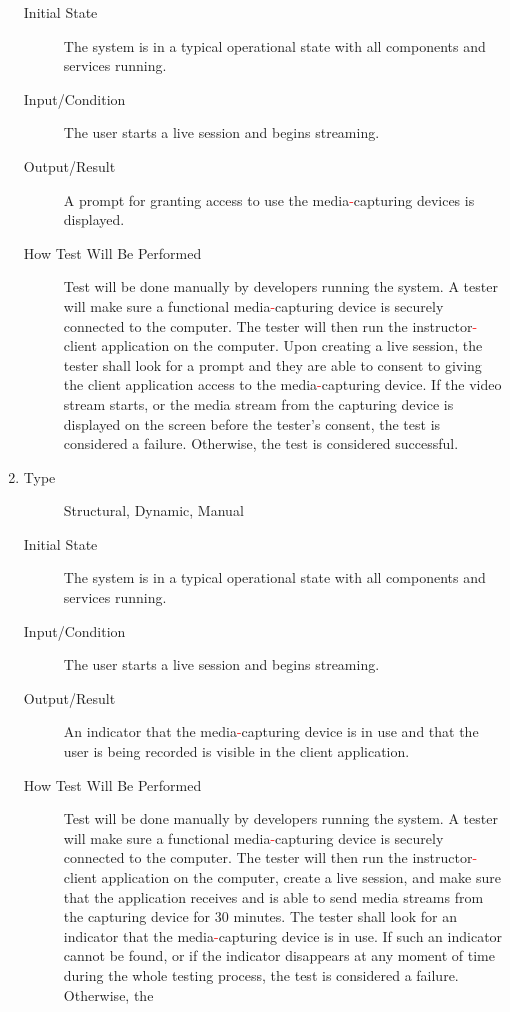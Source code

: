 \documentclass[12pt, titlepage]{article}
\newcommand{\rt}[1]{\textcolor{red}{#1}}
\begin{document}
\begin{enumerate}[NFR-T1]
\begin{description}
  \item[Initial State] The system is in a typical operational state with all
    components and services running.
  \item[Input/Condition] The user starts a live session and begins streaming.
  \item[Output/Result] A prompt for granting access to use the media\rt{-}capturing
    devices is displayed.
  \item[How Test Will Be Performed] Test will be done manually by developers
    running the system. A tester will make sure a functional media\rt{-}capturing
    device is securely connected to the computer. The tester will then run the
    instructor\rt{-}client application on the computer. Upon creating a live session,
    the tester shall look for a prompt and they are able to consent to giving
    the client application access to the media\rt{-}capturing device. If the video
    stream starts, or the media stream from the capturing device is displayed on
    the screen before the tester’s consent, the test is considered a failure.
    Otherwise, the test is considered successful.
  \end{description}
\item \label{NFRT25}
  \begin{description}
  \item[Type] Structural, Dynamic, Manual
  \item[Initial State] The system is in a typical operational state with all
    components and services running.
  \item[Input/Condition] The user starts a live session and begins streaming.
  \item[Output/Result] An indicator that the media\rt{-}capturing device is in use
    and that the user is being recorded is visible in the client application.
  \item[How Test Will Be Performed] Test will be done manually by developers
    running the system. A tester will make sure a functional media\rt{-}capturing
    device is securely connected to the computer. The tester will then run the
    instructor\rt{-}client application on the computer, create a live session, and
    make sure that the application receives and is able to send media streams
    from the capturing device for 30 minutes. The tester shall look for an
    indicator that the media\rt{-}capturing device is in use. If such an indicator
    cannot be found, or if the indicator disappears at any moment of time during
    the whole testing process, the test is considered a failure. Otherwise, the

\end{description}
\end{enumerate}
\end{document}
